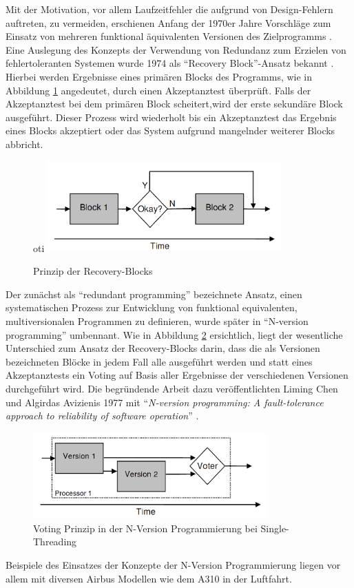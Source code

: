 %
Mit der Motivation, vor allem Laufzeitfehler die aufgrund von Design-Fehlern auftreten, zu vermeiden, erschienen Anfang der 1970er Jahre Vorschläge zum Einsatz von mehreren funktional äquivalenten Versionen des Zielprogramms \cite{methodology}.
Eine Auslegung des Konzepts der Verwendung von Redundanz zum Erzielen von fehlertoleranten Systemen wurde 1974 als \enquote{Recovery Block}-Ansatz bekannt \cite{Horning:1974:PSE:647641.733522}.
Hierbei werden Ergebnisse eines primären Blocks des Programms, wie in Abbildung \ref{graph-recovery} angedeutet, durch einen Akzeptanztest überprüft.
Falls der Akzeptanztest bei dem primären Block scheitert,wird der erste sekundäre Block ausgeführt. Dieser Prozess wird wiederholt bis ein Akzeptanztest das Ergebnis eines Blocks akzeptiert oder das System aufgrund mangelnder weiterer Blocks abbricht.
%
%
\begin{figure}[ht]
	\centering
oti	\includegraphics[width=0.8\textwidth,natwidth=901,natheight=351]{grafiken/recovery-block.png}
	\caption{Prinzip der Recovery-Blocks \cite{lucent}}
	\label{graph-recovery}
\end{figure}
%
%
Der zunächst als \enquote{redundant programming} bezeichnete Ansatz, einen systematischen Prozess zur Entwicklung von funktional equivalenten, multiversionalen Programmen zu definieren, wurde später in \enquote{N-version programming} umbennant.
Wie in Abbildung \ref{graph-n-version-single} ersichtlich, liegt der wesentliche Unterschied zum Ansatz der Recovery-Blocks darin, dass die als Versionen bezeichneten Blöcke in jedem Fall alle ausgeführt werden und statt eines Akzeptanztests ein Voting auf Basis aller Ergebnisse der verschiedenen Versionen durchgeführt wird.
Die begründende Arbeit dazu veröffentlichten Liming Chen und Algirdas Avizienis 1977 mit \enquote{\emph{N-version programming: A fault-tolerance approach to reliability of software operation}} \cite{Chen1978}.
%
%
\begin{figure}[ht]
	\centering
	\includegraphics[width=0.8\textwidth,natwidth=901,natheight=333]{grafiken/single-thread-n-version.png}
	\caption{Voting Prinzip in der N-Version Programmierung bei Single-Threading \cite{lucent}}
	\label{graph-n-version-single}
\end{figure}
%
%
Beispiele des Einsatzes der Konzepte der N-Version Programmierung liegen vor allem mit diversen Airbus Modellen wie dem A310 in der Luftfahrt.
